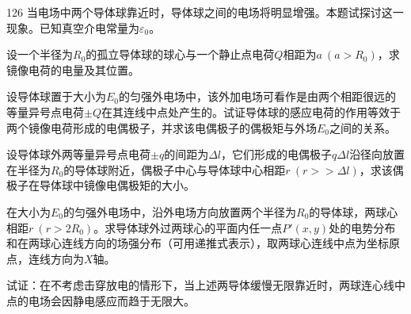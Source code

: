 \begin{problem}[第37届全国中学生物理竞赛决赛][导体球间电场增强现象]{126}
    当电场中两个导体球靠近时，导体球之间的电场将明显增强。本题试探讨这一现象。已知真空介电常量为$\varepsilon _ { 0 }$。
    \begin{subproblem}
        设一个半径为$R _ { 0 }$的孤立导体球的球心与一个静止点电荷$Q$相距为$a \ (a > R _ { 0 } )$，求镜像电荷的电量及其位置。
    \end{subproblem}
    \begin{subproblem}
        设导体球置于大小为$E _ { 0 }$的匀强外电场中，该外加电场可看作是由两个相距很远的等量异号点电荷$\pm Q$在其连线中点处产生的。试证导体球的感应电荷的作用等效于两个镜像电荷形成的电偶极子，并求该电偶极子的偶极矩与外场$E _ { 0 }$之间的关系。
    \end{subproblem}
    \begin{subproblem}
        设导体球外两等量异号点电荷$\pm q$的间距为$\Delta l$，它们形成的电偶极子$q \Delta l$沿径向放置在半径为$R _ { 0 }$的导体球附近，偶极子中心与导体球中心相距$r \ ( r >> \Delta l )$，求该偶极子在导体球中镜像电偶极矩的大小。
    \end{subproblem}
    \begin{subproblem}
        在大小为$E _ { 0 }$的匀强外电场中，沿外电场方向放置两个半径为$R _ { 0 }$的导体球，两球心相距$r \ ( r > 2 R _ { 0 } )$。求导体球外过两球心的平面内任一点$P'(x, y)$处的电势分布和在两球心连线方向的场强分布（可用递推式表示），取两球心连线中点为坐标原点，连线方向为$X$轴。
    \end{subproblem}
    \begin{subproblem}
        试证：在不考虑击穿放电的情形下，当上述两导体缓慢无限靠近时，两球连心线中点的电场会因静电感应而趋于无限大。
    \end{subproblem}
\end{problem}









